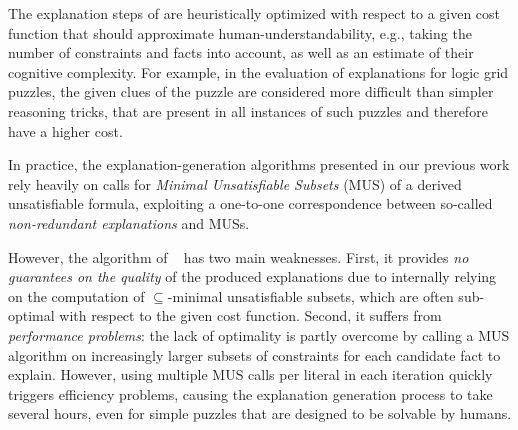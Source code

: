 \documentclass[twoside,11pt]{article}
\newcommand\citet[1]{\citeauthor{#1}~\citeyear{#1}}
\newcommand\comment[1]{\marginpar{\tiny #1}}
\renewcommand\comment[1]{#1}
\newcommand{\emilio}[1]{{\comment{\color{red}Emilio: #1}}}
\newcommand{\bart}[1]{{\comment{\color{OliveGreen}Bart: #1}}}
\begin{document}
The explanation steps of \cite{ecai/BogaertsGCG20} are heuristically optimized with respect to a given cost function that should approximate human-understandability, e.g., taking the number of constraints and facts into account, as well as an estimate of their cognitive complexity.
For example, in the evaluation of explanations for logic grid puzzles, the given clues of the puzzle are considered more difficult than simpler reasoning tricks, that are present in all instances of such puzzles and therefore have a higher cost.


In practice, the explanation-generation algorithms presented in our previous work rely heavily on calls for \emph{Minimal Unsatisfiable Subsets} (MUS) \cite{marques2010minimal} of a derived unsatisfiable formula, exploiting a one-to-one correspondence between so-called \emph{non-redundant explanations} and MUSs. 


However, the algorithm of \citet{ecai/BogaertsGCG20} has two main weaknesses.
First, it provides \emph{no guarantees on the quality} of the produced explanations due to internally relying on the computation of $\subseteq$-minimal unsatisfiable subsets, which are often sub-optimal with respect to the given cost function. 
Second, it suffers from \emph{performance problems}: the lack of optimality is partly overcome by calling a MUS algorithm on increasingly larger subsets of constraints for each candidate fact to explain.
However, using multiple MUS calls per literal in each iteration quickly triggers efficiency problems, causing the explanation generation process to take several hours, even for simple puzzles that are designed to be solvable by humans.
\end{document}
